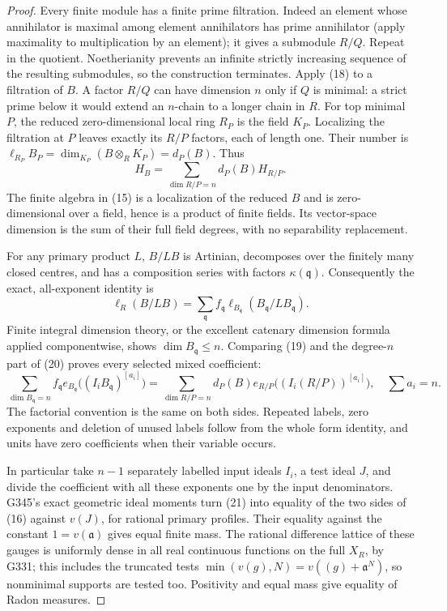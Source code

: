 \begin{proof}
Every finite module has a finite prime filtration. Indeed an element
whose annihilator is maximal among element annihilators has prime
annihilator (apply maximality to multiplication by an element);
it gives a submodule \(R/Q\). Repeat in the quotient. Noetherianity
prevents an infinite strictly increasing sequence of the resulting
submodules, so the construction terminates. Apply (18) to a
filtration of \(B\). A factor \(R/Q\) can have dimension \(n\)
only if \(Q\) is minimal: a strict prime below it would extend an
\(n\)-chain to a longer chain in \(R\).
For top minimal \(P\), the reduced zero-dimensional local ring
\(R_P\) is the field \(K_P\). Localizing the filtration at \(P\)
leaves exactly its \(R/P\) factors, each of length one. Their
number is
\(\ell_{R_P}B_P=\dim_{K_P}(B\otimes_R K_P)=d_P(B)\).
Thus
\[
 H_B=\sum_{\dim R/P=n}d_P(B)H_{R/P}.                          \tag{19}
\]
The finite algebra in (15) is a localization of the reduced \(B\)
and is zero-dimensional over a field, hence is a product of
finite fields. Its vector-space dimension is the sum of their
full field degrees, with no separability replacement.

For any primary product \(L\), \(B/LB\) is Artinian, decomposes
over the finitely many closed centres, and has a composition
series with factors \(\kappa(\mathfrak q)\). Consequently the
exact, all-exponent identity is
\[
 \ell_R(B/LB)=\sum_{\mathfrak q}f_{\mathfrak q}
                      \ell_{B_{\mathfrak q}}(B_{\mathfrak q}/LB_{\mathfrak q}).
                                                               \tag{20}
\]
Finite integral dimension theory, or the excellent catenary
dimension formula applied componentwise, shows
\(\dim B_{\mathfrak q}\leq n\).
Comparing (19) and the degree-\(n\) part of (20) proves every
selected mixed coefficient:
\[
 \sum_{\dim B_{\mathfrak q}=n}f_{\mathfrak q}
 e_{B_{\mathfrak q}}\big((I_iB_{\mathfrak q})^{[a_i]}\big)
 =\sum_{\dim R/P=n}d_P(B)
 e_{R/P}\big((I_i(R/P))^{[a_i]}\big),\quad \sum a_i=n.          \tag{21}
\]
The factorial convention is the same on both sides. Repeated
labels, zero exponents and deletion of unused labels follow from
the whole form identity, and units have zero coefficients when
their variable occurs.

In particular take \(n-1\) separately labelled input ideals
\(I_i\), a test ideal \(J\), and divide the coefficient with all
these exponents one by the input denominators. G345's exact
geometric ideal moments turn (21) into equality of the two sides
of (16) against \(v(J)\), for rational primary profiles.
Their equality against the constant \(1=v(\mathfrak a)\) gives
equal finite mass. The rational difference lattice of these
gauges is uniformly dense in all real continuous functions on
the full \(X_R\), by G331; this includes the truncated tests
\(\min(v(g),N)=v((g)+\mathfrak a^N)\), so nonminimal supports
are tested too. Positivity and equal mass give equality of
Radon measures.


\end{proof}
